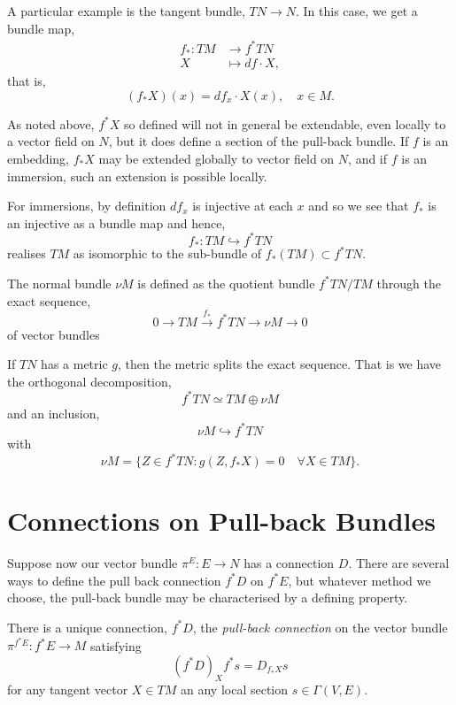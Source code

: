 \documentclass{amsart}
\begin{document}
\begin{example}
A particular example is the tangent bundle, \(TN \to N\). In this case, we get a bundle map,
\begin{align*}
f_{\ast} : TM &\to f^{\ast} TN \\
X &\mapsto df \cdot X,
\end{align*}
that is,
\[
(f_{\ast} X) (x) = df_{x} \cdot X(x), \quad x \in M.
\]

As noted above, \(f^{\ast} X\) so defined will not in general be extendable, even locally to a vector field on \(N\), but it does define a section of the pull-back bundle. If \(f\) is an embedding, \(f_{\ast} X\) may be extended globally to vector field on \(N\), and if \(f\) is an immersion, such an extension is possible locally.

For immersions, by definition \(df_x\) is injective at each \(x\) and so we see that \(f_{\ast}\) is an injective as a bundle map and hence,
\[
f_{\ast} : TM \hookrightarrow f^{\ast} TN
\]
realises \(TM\) as isomorphic to the sub-bundle of \(f_{\ast} (TM) \subset f^{\ast} TN\).

The normal bundle \(\nu M\) is defined as the quotient bundle \(f^{\ast} TN/TM\) through the exact sequence,
\[
0 \to TM \overset{f_{\ast}}{\to} f^{\ast} TN \to \nu M \to 0
\]
of vector bundles

If \(TN\) has a metric \(g\), then the metric splits the exact sequence. That is we have the orthogonal decomposition,
\[
f^{\ast} TN \simeq TM \oplus \nu M
\]
and an inclusion,
\[
\nu M \hookrightarrow f^{\ast} TN
\]
with
\[
\nu M = \{Z \in f^{\ast}TN : g(Z, f_{\ast} X) = 0 \quad \forall X \in TM\}.
\]
\end{example}

\section{Connections on Pull-back Bundles}

Suppose now our vector bundle \(\pi^E : E \to N\) has a connection \(D\). There are several ways to define the pull back connection \(f^{\ast} D\) on \(f^{\ast} E\), but whatever method we choose, the pull-back bundle may be characterised by a defining property.

\begin{lemma}
\label{lem:pullback_connection}
There is a unique connection, \(f^{\ast} D\), the \emph{pull-back connection} on the vector bundle \(\pi^{f^{\ast} E} : f^{\ast}E \to M\) satisfying
\[
(f^{\ast} D)_X f^{\ast} s = D_{f_{\ast} X} s
\]
for any tangent vector \(X \in TM\) an any local section \(s \in \Gamma(V, E)\).
\end{lemma}
\end{document}
